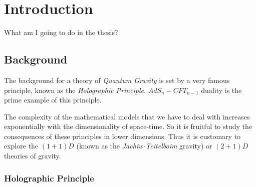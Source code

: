 
\chapter{Introduction} %

\label{Chapter1}



What am I going to do in the thesis?

\section{Background}

The background for a theory of \textit{Quantum Gravity} is set by a very famous principle, known as the \textit{Holographic Principle}. $AdS_n-CFT_{n-1}$ duality is the prime example of this principle. 

The complexity of the mathematical models that we have to deal with increases exponentially with the dimensionality of space-time. So it is fruitful to study the consequences of these principles in lower dimensions. Thus it is customary to explore the $(1+1)D$ (known as the \textit{Jachiw-Teitelboim} gravity) or $(2+1)D$ theories of gravity.  


\subsection{Holographic Principle}

